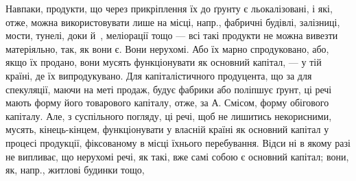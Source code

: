 Навпаки, продукти, що через прикріплення їх до ґрунту є льокалізовані,
і які, отже, можна використовувати лише на місці, напр., фабричні
будівлі, залізниці, мости, тунелі, доки й~, меліорації тощо —
всі такі продукти не можна вивезти матеріяльно, так, як вони є. Вони
нерухомі. Або їх марно спродуковано, або, якщо їх продано, вони мусять
функціонувати як основний капітал, — у тій країні, де їх випродукувано.
Для капіталістичного продуцента, що за для спекуляції, маючи
на меті продаж, будує фабрики або поліпшує ґрунт, ці речі мають форму
його товарового капіталу, отже, за А. Смісом, форму обігового капіталу.
Але, з суспільного погляду, ці речі, щоб не лишитись некорисними,
мусять, кінець-кінцем, функціонувати у власній країні як основний
капітал у процесі продукції, фіксованому в місці їхнього перебування. Відси
ні в якому разі не випливає, що нерухомі речі, як такі, вже самі
собою є основний капітал; вони, як, напр., житлові будинки тощо,
\parbreak{}  %
